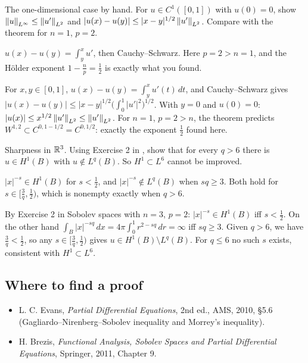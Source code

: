 \begin{exercise}
  The one-dimensional case by hand. For $u \in C^1([0,1])$ with $u(0) = 0$, show $\left\lVert u\right\rVert_{L^\infty} \le \left\lVert u'\right\rVert_{L^2}$ and $|u(x) - u(y)| \le |x-y|^{1/2}\left\lVert u'\right\rVert_{L^2}$. Compare with the theorem for $n = 1$, $p = 2$.
  \begin{hint}
    $u(x) - u(y) = \int_y^x u'$, then Cauchy--Schwarz. Here $p = 2 > n = 1$, and the Hölder exponent $1 - \frac{n}{p} = \frac12$ is exactly what you found.
  \end{hint}
  \begin{solution}
    For $x, y \in [0,1]$, $u(x) - u(y) = \int_y^x u'(t)\,dt$, and Cauchy--Schwarz gives $|u(x) - u(y)| \le |x - y|^{1/2}\big(\int_0^1|u'|^2\big)^{1/2}$. With $y = 0$ and $u(0) = 0$: $|u(x)| \le x^{1/2}\left\lVert u'\right\rVert_{L^2} \le \left\lVert u'\right\rVert_{L^2}$. For $n = 1$, $p = 2 > n$, the theorem predicts $W^{1,2} \subset C^{0,1-1/2} = C^{0,1/2}$: exactly the exponent $\frac12$ found here.
  \end{solution}
\end{exercise}

\begin{exercise}
  Sharpness in $\mathbb{R}^3$. Using Exercise 2 in , show that for every $q > 6$ there is $u \in H^1(B)$ with $u \notin L^q(B)$. So $H^1 \subset L^6$ cannot be improved.
  \begin{hint}
    $|x|^{-s} \in H^1(B)$ for $s < \frac12$, and $|x|^{-s} \notin L^q(B)$ when $sq \ge 3$. Both hold for $s \in [\frac3q, \frac12)$, which is nonempty exactly when $q > 6$.
  \end{hint}
  \begin{solution}
    By Exercise 2 in Sobolev spaces with $n = 3$, $p = 2$: $|x|^{-s} \in H^1(B)$ iff $s < \frac12$. On the other hand $\int_B|x|^{-sq}\,dx = 4\pi\int_0^1 r^{2-sq}\,dr = \infty$ iff $sq \ge 3$. Given $q > 6$, we have $\frac3q < \frac12$, so any $s \in [\frac3q, \frac12)$ gives $u \in H^1(B)\setminus L^q(B)$. For $q \le 6$ no such $s$ exists, consistent with $H^1 \subset L^6$.
  \end{solution}
\end{exercise}

\subsection*{Where to find a proof}

\begin{itemize}
\item L. C. Evans, \emph{Partial Differential Equations}, 2nd ed., AMS, 2010, §5.6 (Gagliardo--Nirenberg--Sobolev inequality and Morrey's inequality).
\item H. Brezis, \emph{Functional Analysis, Sobolev Spaces and Partial Differential Equations}, Springer, 2011, Chapter 9.
\end{itemize}

\neededfor
